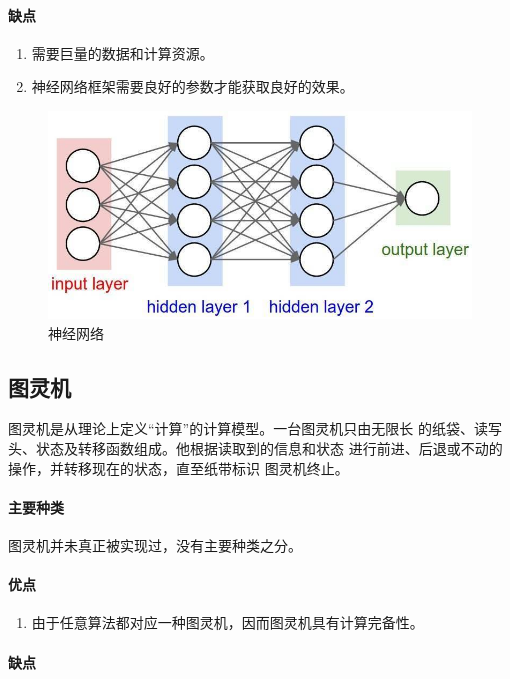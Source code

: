 \documentclass[UTF8]{ctexart}
\begin{document}
\paragraph*{缺点}

\begin{enumerate}
    \item 需要巨量的数据和计算资源。
    \item 神经网络框架需要良好的参数才能获取良好的效果。
\end{enumerate}

\begin{figure}[H]
\centering
\includegraphics[width=.8\textwidth]{./pics/7.jpg}
\caption{神经网络}
\end{figure}

\subsection{图灵机}

图灵机是从理论上定义“计算”的计算模型。一台图灵机只由无限长
的纸袋、读写头、状态及转移函数组成。他根据读取到的信息和状态
进行前进、后退或不动的操作，并转移现在的状态，直至纸带标识
图灵机终止。

\paragraph*{主要种类}

图灵机并未真正被实现过，没有主要种类之分。

\paragraph*{优点}

\begin{enumerate}
    \item 由于任意算法都对应一种图灵机，因而图灵机具有计算完备性。
\end{enumerate}

\paragraph*{缺点}
\end{document}
